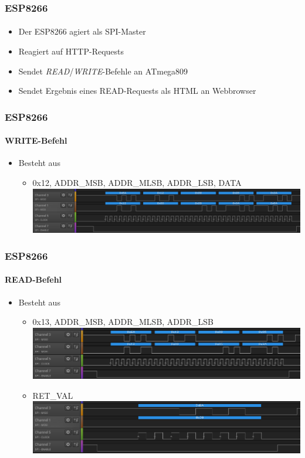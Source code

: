\documentclass{beamer}
\begin{document}
\begin{frame}

	\frametitle{ESP8266}
	\framesubtitle{}
	\begin{itemize}
		\item Der ESP8266 agiert als SPI-Master
		\item Reagiert auf HTTP-Requests
		\item Sendet \textit{READ}/\textit{WRITE}-Befehle an ATmega809
		\item Sendet Ergebnis eines READ-Requests als HTML an Webbrowser
	\end{itemize}
	
\end{frame}

\begin{frame}

	\frametitle{ESP8266}
	\framesubtitle{WRITE-Befehl}
	\begin{itemize}
		\item Besteht aus
		\begin{itemize}
			\item 0x12, ADDR\_MSB, ADDR\_MLSB, ADDR\_LSB, DATA\\
			\includegraphics[scale=0.375]{images/SPI_Write_CMD_capture.png}
		\end{itemize}
	\end{itemize}
	
\end{frame}

\begin{frame}

	\frametitle{ESP8266}
	\framesubtitle{READ-Befehl}
	\begin{itemize}
		\item Besteht aus
		\begin{itemize}
			\item 0x13, ADDR\_MSB, ADDR\_MLSB, ADDR\_LSB\\
			\includegraphics[scale=0.4]{images/SPI_Read_CMD_capture_01.png}
			\item RET\_VAL\\
			\includegraphics[scale=0.4]{images/SPI_Read_CMD_capture_02.png}
		\end{itemize}
	\end{itemize}
	
\end{frame}
\end{document}
